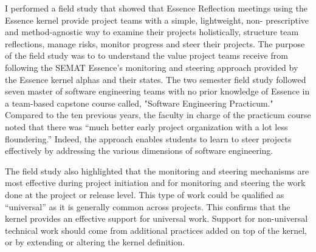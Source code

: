 \documentclass[preprint,12pt,3p]{elsarticle}
\begin{document}
I performed a field study \cite{ICSE2014} that showed that Essence Reflection meetings \cite{EASE2014} using the Essence kernel provide project teams with a simple, lightweight, non- prescriptive and method-agnostic way to examine their projects holistically, structure team reflections, manage risks, monitor progress and steer their projects. The purpose of the field study was to to understand the value project teams receive from following the SEMAT Essence’s monitoring and steering approach provided by the Essence kernel alphas and their states. The two semester field study followed seven master of software engineering teams with no prior knowledge of Essence in a team-based capstone course called, "Software Engineering Practicum." Compared to the ten previous years, the faculty in charge of the practicum course noted that there was “much better early project organization with a lot less floundering.” Indeed, the approach enables students to learn to steer projects effectively by addressing the various dimensions of software engineering.

The field study also highlighted that the monitoring and steering mechanisms are most effective during project initiation and for monitoring and steering the work done at the project or release level. This type of work could be qualified as “universal” as it is generally common across projects. This confirms that the kernel provides an effective support for universal work. Support for non-universal technical work should come from additional practices added on top of the kernel, or by extending or altering the kernel definition.

\end{document}

